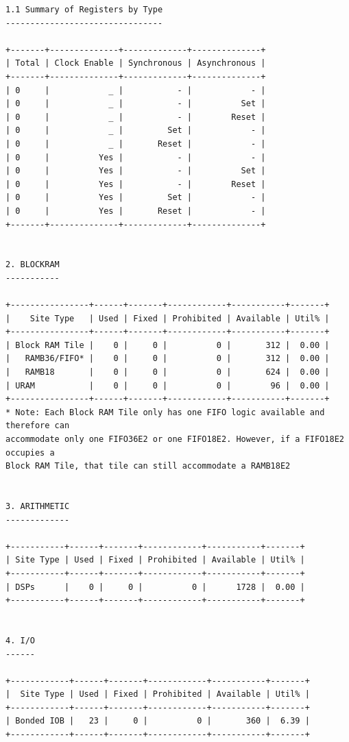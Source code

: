 \documentclass{article}
\begin{document}
\begin{lstlisting}
1.1 Summary of Registers by Type
--------------------------------

+-------+--------------+-------------+--------------+
| Total | Clock Enable | Synchronous | Asynchronous |
+-------+--------------+-------------+--------------+
| 0     |            _ |           - |            - |
| 0     |            _ |           - |          Set |
| 0     |            _ |           - |        Reset |
| 0     |            _ |         Set |            - |
| 0     |            _ |       Reset |            - |
| 0     |          Yes |           - |            - |
| 0     |          Yes |           - |          Set |
| 0     |          Yes |           - |        Reset |
| 0     |          Yes |         Set |            - |
| 0     |          Yes |       Reset |            - |
+-------+--------------+-------------+--------------+


2. BLOCKRAM
-----------

+----------------+------+-------+------------+-----------+-------+
|    Site Type   | Used | Fixed | Prohibited | Available | Util% |
+----------------+------+-------+------------+-----------+-------+
| Block RAM Tile |    0 |     0 |          0 |       312 |  0.00 |
|   RAMB36/FIFO* |    0 |     0 |          0 |       312 |  0.00 |
|   RAMB18       |    0 |     0 |          0 |       624 |  0.00 |
| URAM           |    0 |     0 |          0 |        96 |  0.00 |
+----------------+------+-------+------------+-----------+-------+
* Note: Each Block RAM Tile only has one FIFO logic available and therefore can 
accommodate only one FIFO36E2 or one FIFO18E2. However, if a FIFO18E2 occupies a 
Block RAM Tile, that tile can still accommodate a RAMB18E2


3. ARITHMETIC
-------------

+-----------+------+-------+------------+-----------+-------+
| Site Type | Used | Fixed | Prohibited | Available | Util% |
+-----------+------+-------+------------+-----------+-------+
| DSPs      |    0 |     0 |          0 |      1728 |  0.00 |
+-----------+------+-------+------------+-----------+-------+


4. I/O
------

+------------+------+-------+------------+-----------+-------+
|  Site Type | Used | Fixed | Prohibited | Available | Util% |
+------------+------+-------+------------+-----------+-------+
| Bonded IOB |   23 |     0 |          0 |       360 |  6.39 |
+------------+------+-------+------------+-----------+-------+



\end{lstlisting}
\end{document}
